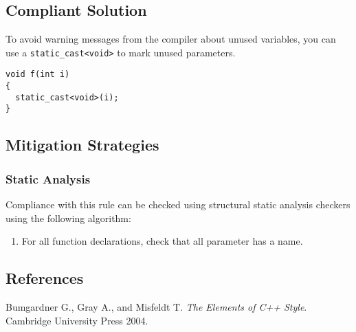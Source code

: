 \subsection{Compliant Solution}

To avoid warning messages from the compiler about unused variables,
you can use a \texttt{static\_cast<void>} to mark unused parameters.

\begin{verbatim}
void f(int i)
{
  static_cast<void>(i);
}
\end{verbatim}

\subsection{Mitigation Strategies}
\subsubsection{Static Analysis}

Compliance with this rule can be checked using structural static
analysis checkers using the following algorithm:

\begin{enumerate}
\item For all function declarations, check that all parameter has a name.
\end{enumerate}

\subsection{References}


Bumgardner G., Gray A., and Misfeldt T. {\it The Elements of C++
Style}. Cambridge University Press 2004.
